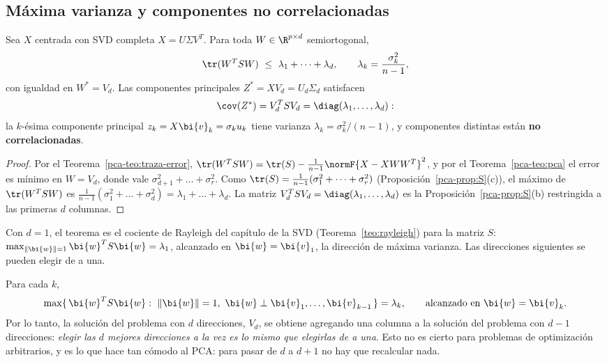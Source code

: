\subsection{Máxima varianza y componentes no correlacionadas}

\begin{theorem}[PCA $=$ máxima varianza explicada]\label{pca-teo:varianza}
Sea $X$ centrada con SVD completa $X=U\Sigma V^T$. Para toda $W\in\R^{p\times d}$
semiortogonal,
\[
\tr(W^T SW)\ \le\ \lambda_1+\dots+\lambda_d ,\qquad \lambda_k=\frac{\sigma_k^2}{n-1},
\]
con igualdad en $W^\ast=V_d$. Las componentes principales
$Z^\ast=XV_d=U_d\Sigma_d$ satisfacen
\[
\cov(Z^\ast)=V_d^T SV_d=\diag(\lambda_1,\dots,\lambda_d):
\]
la $k$-ésima componente principal $z_k=X\bi{v}_k=\sigma_ku_k$ tiene varianza
$\lambda_k=\sigma_k^2/(n-1)$, y componentes distintas están
\textbf{no correlacionadas}.
\end{theorem}

\begin{proof}
Por el Teorema~\ref{pca-teo:traza-error},
$\tr(W^T SW)=\tr(S)-\frac{1}{n-1}\normF{X-XWW^T}^2$, y por el
Teorema~\ref{pca-teo:pca} el error es mínimo en $W=V_d$, donde vale
$\sigma_{d+1}^2+\dots+\sigma_r^2$. Como
$\tr(S)=\frac{1}{n-1}(\sigma_1^2+\dots+\sigma_r^2)$
(Proposición~\ref{pca-prop:S}(c)), el máximo de $\tr(W^T SW)$ es
$\frac{1}{n-1}(\sigma_1^2+\dots+\sigma_d^2)=\lambda_1+\dots+\lambda_d$. La matriz
$V_d^T SV_d=\diag(\lambda_1,\dots,\lambda_d)$ es la
Proposición~\ref{pca-prop:S}(b) restringida a las primeras $d$ columnas.
\end{proof}

Con $d=1$, el teorema es el cociente de Rayleigh del capítulo de la SVD
(Teorema~\ref{teo:rayleigh}) para la matriz $S$:
$\max_{\|\bi{w}\|=1}\bi{w}^T S\bi{w}=\lambda_1$, alcanzado en $\bi{w}=\bi{v}_1$, la dirección de
máxima varianza. Las direcciones siguientes se pueden elegir de a una.

\begin{corollary}\label{pca-cor:anidadas}
Para cada $k$,
\[
\max\{\,\bi{w}^T S\bi{w}:\ \|\bi{w}\|=1,\ \bi{w}\perp \bi{v}_1,\dots,\bi{v}_{k-1}\,\}=\lambda_k ,
\qquad\text{alcanzado en } \bi{w}=\bi{v}_k .
\]
Por lo tanto, la solución del problema con $d$ direcciones, $V_d$, se obtiene
agregando una columna a la solución del problema con $d-1$ direcciones:
\emph{elegir las $d$ mejores direcciones a la vez es lo mismo que elegirlas
de a una}. Esto no es cierto para problemas de optimización arbitrarios, y es
lo que hace tan cómodo al PCA: para pasar de $d$ a $d+1$ no hay que
recalcular nada.
\end{corollary}

